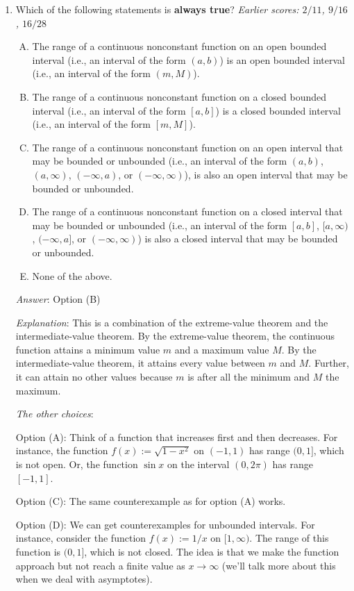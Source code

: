 \documentclass[10pt]{amsart}
\begin{document}
\begin{enumerate}
\item Which of the following statements is {\bf always true}? {\em
  Earlier scores: $2/11$, $9/16$, $16/28$}

  \begin{enumerate}[(A)]
  \item The range of a continuous nonconstant function on an open
    bounded interval (i.e., an interval of the form $(a,b)$) is an
    open bounded interval (i.e., an interval of the form $(m,M)$).
  \item The range of a continuous nonconstant function on a closed
    bounded interval (i.e., an interval of the form $[a,b]$) is a
    closed bounded interval (i.e., an interval of the form $[m,M]$).
  \item The range of a continuous nonconstant function on an open
    interval that may be bounded or unbounded (i.e., an interval of
    the form $(a,b)$,$(a,\infty)$, $(-\infty,a)$, or
    $(-\infty,\infty)$), is also an open interval that may be bounded
    or unbounded.
  \item The range of a continuous nonconstant function on a closed
    interval that may be bounded or unbounded (i.e., an interval of
    the form $[a,b]$, $[a,\infty)$, $(-\infty,a]$, or
    $(-\infty,\infty)$) is also a closed interval that may be bounded
    or unbounded.
  \item None of the above.
  \end{enumerate}

  {\em Answer}: Option (B)

  {\em Explanation}: This is a combination of the extreme-value
  theorem and the intermediate-value theorem. By the extreme-value
  theorem, the continuous function attains a minimum value $m$ and a
  maximum value $M$. By the intermediate-value theorem, it attains
  every value between $m$ and $M$. Further, it can attain no other
  values because $m$ is after all the minimum and $M$ the maximum.

  {\em The other choices}:

  Option (A): Think of a function that increases first and then
  decreases. For instance, the function $f(x) := \sqrt{1 - x^2}$ on
  $(-1,1)$ has range $(0,1]$, which is not open. Or, the function
  $\sin x$ on the interval $(0,2\pi)$ has range $[-1,1]$.

  Option (C): The same counterexample as for option (A) works.

  Option (D): We can get counterexamples for unbounded intervals. For
  instance, consider the function $f(x) := 1/x$ on $[1,\infty)$. The
  range of this function is $(0,1]$, which is not closed. The idea is
  that we make the function approach but not reach a finite value as
  $x \to \infty$ (we'll talk more about this when we deal with
  asymptotes).


\end{enumerate}
\end{document}
